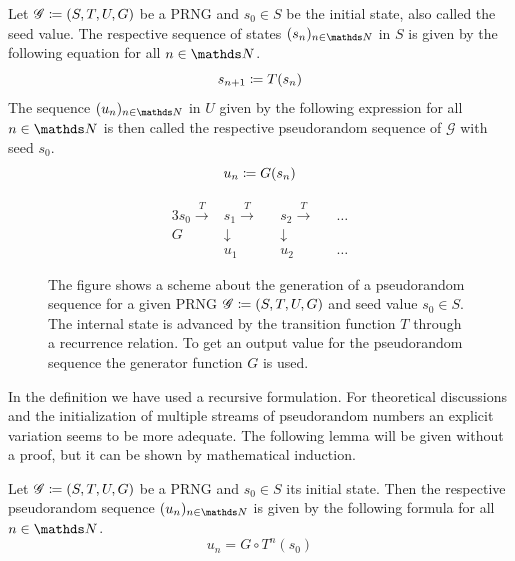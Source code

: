 \documentclass{stdlocal}
\begin{document}
    \begin{definition}
      Let $\mathscr{G}\coloneqq (S,T,U,G)$ be a PRNG and $s_0\in S$ be the initial state, also called the seed value.
      The respective sequence of states $(s_n)_{n\in\setNatural}$ in $S$ is given by the following equation for all $n\in\setNatural$.
      \[
        s_{n+1} \coloneqq T(s_n)
      \]
      The sequence $(u_n)_{n\in\setNatural}$ in $U$ given by the following expression for all $n\in\setNatural$ is then called the respective pseudorandom sequence of $\mathscr{G}$ with seed $s_0$.
      \[
        u_n \coloneqq G(s_n)
      \]
    \end{definition}
    \begin{figure}
      \center
      \begin{minipage}[b]{0.5\textwidth}
      \begin{alignat*}{3}
        s_0 \xrightarrow{T} &s_1 \xrightarrow{T} &&s_2 \xrightarrow{T} &&\ldots \\
        G &\downarrow &&\downarrow \\
        &u_1 &&u_2 &&\ldots
      \end{alignat*}
      \end{minipage}
      \caption[Generation of a Pseudorandom Sequence]{%
        The figure shows a scheme about the generation of a pseudorandom sequence for a given PRNG $\mathscr{G}\coloneqq (S,T,U,G)$ and seed value $s_0\in S$.
        The internal state is advanced by the transition function $T$ through a recurrence relation.
        To get an output value for the pseudorandom sequence the generator function $G$ is used.
      }
      \label{fig:scheme-pseudorandom-sequence}
    \end{figure}
    In the definition we have used a recursive formulation.
    For theoretical discussions and the initialization of multiple streams of pseudorandom numbers an explicit variation seems to be more adequate.
    The following lemma will be given without a proof, but it can be shown by mathematical induction.

    \begin{lemma}
    \label{lemma:explicit-formulation-pseudorandom-sequence}
      Let $\mathscr{G}\coloneqq (S,T,U,G)$ be a PRNG and $s_0\in S$ its initial state.
      Then the respective pseudorandom sequence $(u_n)_{n\in\setNatural}$ is given by the following formula for all $n\in\setNatural$.
      \[
        u_n = G\circ T^{n}(s_0)
      \]
    \end{lemma}
\end{document}
